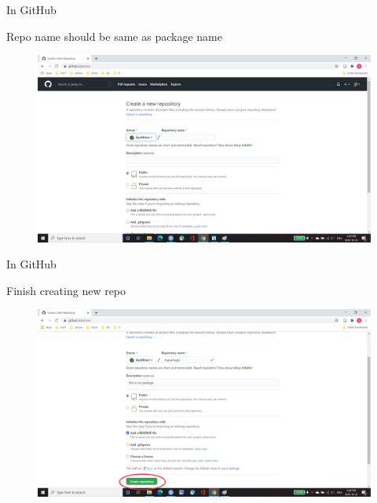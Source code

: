 \documentclass[
  ignorenonframetext,
]{beamer}
\begin{document}
\begin{frame}{In GitHub}
\protect\hypertarget{in-github-2}{}

Repo name should be same as package name

\begin{figure}
  \includegraphics[scale=0.275]{slides_files/figure-beamer/GitHub_step3.png}
\end{figure}

\end{frame}

\begin{frame}{In GitHub}
\protect\hypertarget{in-github-3}{}

Finish creating new repo

\begin{figure}
  \includegraphics[scale=0.275]{slides_files/figure-beamer/GitHub_step4.png}
\end{figure}

\end{frame}
\end{document}
